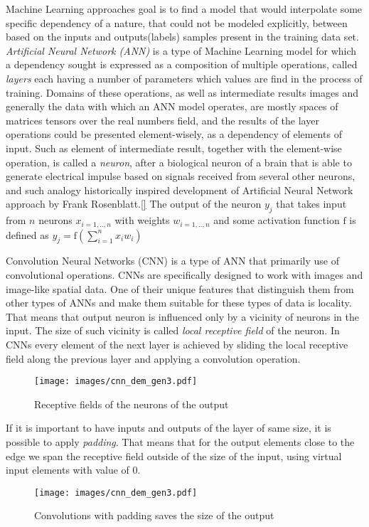 Machine Learning approaches goal is to find a model that would interpolate some specific dependency of a nature, that could not be modeled explicitly, between based on the inputs and outputs(labels) samples present in the training data set.
\textit{Artificial Neural Network (ANN)} is a type of Machine Learning model for which a dependency sought is expressed as a composition of multiple operations, called \textit{layers} each having a number of parameters which values are find in the process of training.
Domains of these operations, as well as intermediate results images and generally the data with which an ANN model operates, are mostly spaces of matrices tensors over the real numbers field, and the results of the layer operations could be presented element-wisely, as a dependency of elements of input.
Such as element of intermediate result, together with the element-wise operation, is called a \textit{neuron}, after a biological neuron of a brain that is able to generate electrical impulse based on signals received from several other neurons, and such analogy historically inspired development of Artificial Neural Network approach by Frank Rosenblatt.\ref{}
The output of the neuron $y_{j}$ that takes input from $n$ neurons $x_{i=1,..,n}$ with weights $w_{i=1,..,n}$ and some activation function $\mathrm{f}$ is defined as $ y_{j}=\mathrm{f}(\sum_{i=1}^{n} x_{i}w_{i})$
\medskip
{}

Convolution Neural Networks (CNN) is a type of ANN that primarily use of convolutional operations.
CNNs are specifically designed to work with images and image-like spatial data.
One of their unique features that distinguish them from other types of ANNs and make them suitable for these types of data is locality.
That means that output neuron is influenced only by a vicinity of neurons in the input.
The size of such vicinity is called \textit{local receptive field} of the neuron.
In CNNs every element of the next layer is achieved by sliding the local receptive field along the previous layer and applying a convolution operation.
\begin{figure}
	\centering
	\texttt{[image: images/cnn\_dem\_gen3.pdf]}
	\caption{Receptive fields of the neurons of the output}
	\label{fig:rec_field_demo}
\end{figure}

If it is important to have inputs and outputs of the layer of same size, it is possible to apply \textit{padding}.
That means that for the output elements close to the edge we span the receptive field outside of the size of the input, using virtual input elements with value of $0$. 
\begin{figure}
	\centering
	\texttt{[image: images/cnn\_dem\_gen3.pdf]}
	\caption{Convolutions with padding saves the size of the output}
	\label{fig:padding_demo}
\end{figure}
\medskip


